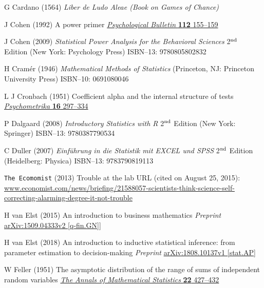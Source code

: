 \begin{thebibliography}{99}
G Cardano
(1564) \textit{Liber de Ludo Aleae (Book on Games of Chance)}

J Cohen (1992)
A power primer \href{https://doi.org/10.1037/0033-2909.112.1.155}{\textit{Psychological Bulletin} \textbf{112} 155--159}

J Cohen
(2009) \textit{Statistical Power Analysis for the Behavioral 
Sciences} 2$^{\rm nd}$ Edition (New York: Psychology Press) 
ISBN--13: 9780805802832

H Cram\'{e}r
(1946) \textit{Mathematical Methods of Statistics}
(Princeton, NJ: Princeton University Press) ISBN--10: 0691080046

L J Cronbach
(1951) Coefficient alpha and the internal structure of tests
\href{http://dx.doi.org/10.1007/BF02310555}{\textit{Psychometrika}
\textbf{16} 297--334}

P Dalgaard
(2008) \textit{Introductory Statistics with R}
2$^{\rm nd}$ Edition (New York: Springer) ISBN--13: 9780387790534

C Duller
(2007) \textit{Einf\"uhrung in die Statistik mit EXCEL und SPSS}
2$^{\rm nd}$ Edition (Heidelberg: Physica) ISBN--13: 9783790819113

{\tt The Ecomomist}
(2013) Trouble at the lab URL (cited on August 25, 2015):
\href{http://www.economist.com/news/briefing/21588057-scientists-think-science-self-correcting-alarming-degree-it-not-trouble}{www.economist.com/news/briefing/21588057-scientists-think-science-self-correcting-alarming-degree-it-not-trouble}

H van Elst
(2015) An introduction to business mathematics
\textit{Preprint}
\href{http://arxiv.org/abs/1509.04333}{arXiv:1509.04333v2 
[q-fin.GN]}]

H van Elst
(2018) An introduction to inductive statistical inference: from
parameter estimation to decision-making \textit{Preprint}
\href{http://arxiv.org/abs/1808.10137}{arXiv:1808.10137v1
[stat.AP]}

W Feller
(1951) The asymptotic distribution of the range of sums of 
independent random variables
\href{http://www.jstor.org/stable/2236629}{\textit{The Annals of 
Mathematical Statistics} \textbf{22} 427--432}


\end{thebibliography}
